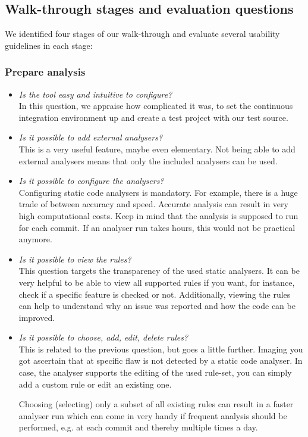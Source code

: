 \documentclass[conference]{IEEEtran}
\begin{document}
\subsection{Walk-through stages and evaluation questions}
\label{subsec:walkthrough}

We identified four stages of our walk-through and evaluate several usability guidelines in each stage:

\subsubsection{Prepare analysis}
\label{subsubsec:evaluation_prepare}
\begin{itemize}
	\item \textit{Is the tool easy and intuitive to configure?} \\
	In this question, we appraise how complicated it was, to set the continuous integration environment up and create a test project with our test source.
	
	\item \textit{Is it possible to add external analysers?} \\
	This is a very useful feature, maybe even elementary. Not being able to add external analysers means that only the included analysers can be used.
	
	\item \textit{Is it possible to configure the analysers?} \\
	Configuring static code analysers is mandatory. For example, there is a huge trade of between accuracy and speed. Accurate analysis can result in very high computational costs. Keep in mind that the analysis is supposed to run for each commit. If an analyser run takes hours, this would not be practical anymore.
	
	\item \textit{Is it possible to view the rules?} \\
	This question targets the transparency of the used static analysers. It can be very helpful to be able to view all supported rules if you want, for instance, check if a specific feature is checked or not. Additionally, viewing the rules can help to understand why an issue was reported and how the code can be improved.
	
	\item \textit{Is it possible to choose, add, edit, delete rules?} \\
	This is related to the previous question, but goes a little further. Imaging you got ascertain that at specific flaw is not detected by a static code analyser. In case, the analyser supports the editing of the used rule-set, you can simply add a custom rule or edit an existing one.
	
	Choosing (selecting) only a subset of all existing rules can result in a faster analyser run which can come in very handy if frequent analysis should be performed, e.g. at each commit and thereby multiple times a day.
\end{itemize}
\end{document}
